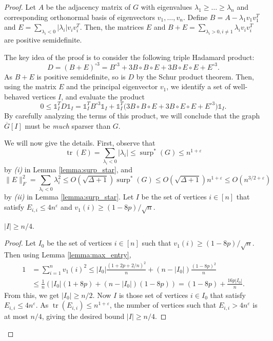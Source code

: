 \documentclass[10pt,a4paper]{amsart}
\DeclareMathOperator{\surp}{surp}
\DeclareMathOperator{\trace}{tr}
\newcommand{\eps}{\varepsilon}
\begin{document}
\begin{proof}
Let $A$ be the adjacency matrix of $G$ with eigenvalues $\lambda_1\geq \dots\geq \lambda_n$ and corresponding orthonormal basis of eigenvectors $v_1,\dots,v_n$. Define $B=A-\lambda_1v_1v_1^T$ and $E=\sum_{\lambda_i<0}|\lambda_i| v_iv_i^T$. Then, the matrices $E$ and $B+E=\sum_{\lambda_i>0,i\neq 1}\lambda_i v_iv_i^T$ are positive semidefinite. 

The key idea of the proof is to consider the following triple Hadamard product:
$$D=(B+E)^{\circ 3}=B^{\circ 3}+3B\circ B\circ E+3B\circ E\circ E+E^{\circ 3}.$$
As $B+E$ is positive semidefinite, so is $D$ by the Schur product theorem. Then, using the matrix $E$ and the principal eigenvector $v_1$, we identify a set of well-behaved vertices $I$, and evaluate the product \[0\leq \mathds{1}_I^T D \mathds{1}_I= \mathds{1}_I^TB^{\circ 3}\mathds{1}_I+\mathds{1}_I^T\big(3B\circ B\circ E+3B\circ E\circ E+E^{\circ 3}\big) \mathds{1}_I.\]
By carefully analyzing the terms of this product, we will conclude that the graph $\overline{G}[I]$ must be \textit{much} sparser than $G$.

We will now give the details. First, observe that 
$$\trace(E)=\sum_{\lambda_i<0}|\lambda_i|\leq \surp^*(G)\leq n^{1+\eps}$$
by \textit{(i)} in Lemma \ref{lemma:surp_star}, and 
$$\|E\|_F^2=\sum_{\lambda_i<0}\lambda_i^2\leq O(\sqrt{\Delta+1})\surp^*(G)\leq O(\sqrt{\Delta+1}) n^{1+\eps}\leq O(n^{3/2+\eps})$$
by \textit{(ii)} in Lemma \ref{lemma:surp_star}. Let $I$ be the set of vertices $i\in [n]$ that satisfy $E_{i,i}\leq 4n^{\eps}$ and $v_1(i)\geq (1-8p)/\sqrt{n}$.
\begin{claim}
$|I|\geq n/4$.
\end{claim}
\begin{proof}
Let $I_0$ be the set of vertices $i\in [n]$ such that $v_1(i)\geq (1-8p)/\sqrt{n}.$ Then using Lemma \ref{lemma:max_entry},
\begin{align*}
    1&=\sum_{i=1}^nv_1(i)^2\leq |I_0|\frac{(1+2p+2/n)^2}{n}+(n-|I_0|)\frac{(1-8p)^2}{n}\\
    &\leq \frac{1}{n}\left(|I_0|(1+8p)+(n-|I_0|)(1-8p)\right)=(1-8p)+\frac{16p|I_0|}{n}.
\end{align*}
From this, we get $|I_0|\geq n/2$. Now $I$ is those set of vertices $i\in I_0$ that satisfy $E_{i,i}\leq 4n^{\eps}$. As $\trace(E_{i,i})\leq n^{1+\eps}$, the number of vertices such that $E_{i,i}>4n^{\eps}$ is at most $n/4$, giving the desired bound $|I|\geq n/4$. 
\end{proof}


\end{proof}
\end{document}
